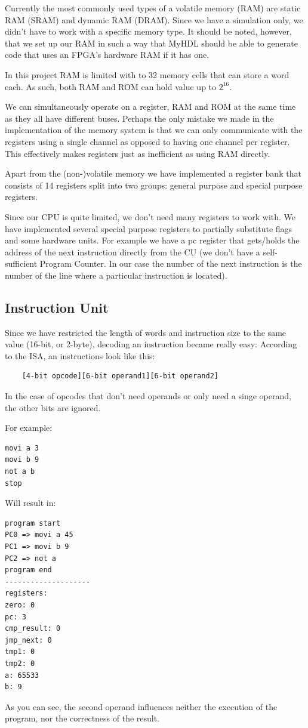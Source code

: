 \documentclass[12pt,a4paper]{scrartcl}
\begin{document}
Currently the most commonly used types of a volatile memory (RAM) are static RAM (SRAM) and dynamic RAM (DRAM). Since we have a simulation only, we didn't have to work with a specific memory type. It should be noted, however, that we set up our RAM in such a way that MyHDL should be able to generate code that uses an FPGA's hardware RAM if it has one.

In this project RAM is limited with to 32 memory cells that can store a word each. As such, both RAM and ROM can hold value up to $2^{16}$.

We can simultaneously operate on a register, RAM and ROM at the same time as they all have different buses. Perhaps the only mistake we made in the implementation of the memory system is that we can only communicate with the registers using a single channel as opposed to having one channel per register. This effectively makes registers just as inefficient as using RAM directly.

Apart from the (non-)volatile memory we have implemented a register bank that consists of 14 registers split into two groups: general purpose and special purpose registers.

Since our CPU is quite limited, we don't need many registers to work with. We have implemented several special purpose registers to partially substitute flags and some hardware units. For example we have a pc register that gets/holds the address of the next instruction directly from the CU (we don't have a self-sufficient Program Counter. In our case the number of the next instruction is the number of the line where a particular instruction is located).

\subsection{Instruction Unit}
Since we have restricted the length of words and instruction size to the same value (16-bit, or 2-byte), decoding an instruction became really easy:
According to the ISA, an instructions look like this:
\begin{verbatim}
	[4-bit opcode][6-bit operand1][6-bit operand2]
\end{verbatim} 
In the case of opcodes that don't need operands or only need a singe operand, the other bits are ignored.

For example:

\begin{verbatim}
movi a 3
movi b 9
not a b
stop
\end{verbatim}
Will result in:
\begin{verbatim}
program start
PC0 => movi a 45
PC1 => movi b 9
PC2 => not a
program end
--------------------
registers:
zero: 0
pc: 3
cmp_result: 0
jmp_next: 0
tmp1: 0
tmp2: 0
a: 65533
b: 9
\end{verbatim}
As you can see, the second operand influences neither the execution of the program, nor the correctness of the result.
\end{document}
